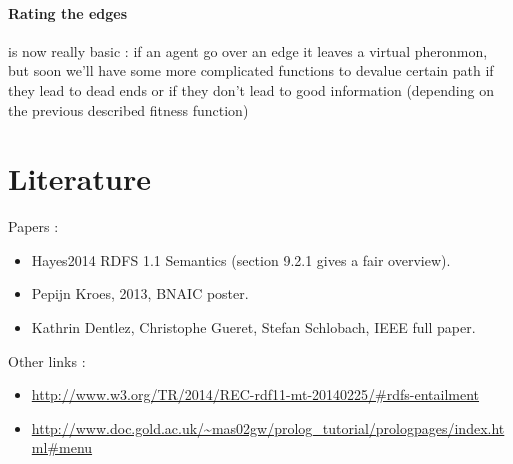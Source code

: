 \documentclass{article}
\newenvironment{itemh}[0]{\begin{itemize}[label=$\heartsuit$, font=\color{gray} \small]}{\end{itemize}}
\begin{document}
		\paragraph{Rating the edges} is now really basic : if an agent go over an edge it leaves a virtual pheronmon,
			but soon we'll have some more complicated functions to devalue certain path if they lead to dead ends or
			if they don't lead to good information (depending on the previous described fitness function)

\newpage

\section{Literature}
	Papers :
	\begin{itemh}
		\item Hayes2014 RDFS 1.1 Semantics (section 9.2.1 gives a fair overview).
		\item Pepijn Kroes, 2013, BNAIC poster.
		\item Kathrin Dentlez, Christophe Gueret, Stefan Schlobach, IEEE full paper.
	\end{itemh}
	Other links :
	\begin{itemh}
		\item\url{http://www.w3.org/TR/2014/REC-rdf11-mt-20140225/#rdfs-entailment}
		\item \url{http://www.doc.gold.ac.uk/~mas02gw/prolog_tutorial/prologpages/index.html#menu}
	\end{itemh}
\end{document}
